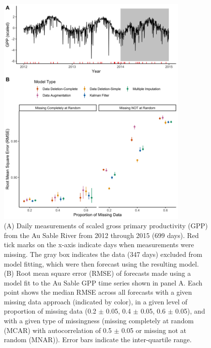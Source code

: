 \documentclass{article}
\begin{document}
\begin{figure}
    \centering
    \noindent\includegraphics[width = 0.85\textwidth]{Figures/MockedUpFigures/RMSE_FullFigure_NoLineWithErrorBar_gaussian_auSable.png}

    \caption{(A) Daily measurements of scaled gross primary productivity (GPP) from the Au Sable River from 2012 through 2015 (699 days). Red tick marks on the x-axis indicate days when measurements were missing. The gray box indicates the data (347 days) excluded from model fitting, which were then forecast using the resulting model. (B) Root mean square error (RMSE) of forecasts made using a model fit to the Au Sable GPP time series shown in panel A. Each point shows the median RMSE across all forecasts with a given missing data approach (indicated by color), in a given level of proportion of missing data (0.2 $\pm$ 0.05, 0.4 $\pm$ 0.05, 0.6 $\pm$ 0.05), and with a given type of missingness (missing completely at random (MCAR) with autocorrelation of 0.5 $\pm$ 0.05 or missing not at random (MNAR)). Error bars indicate the inter-quartile range.}

    \label{fig:RMSE_Gaus}
\end{figure}
\end{document}

